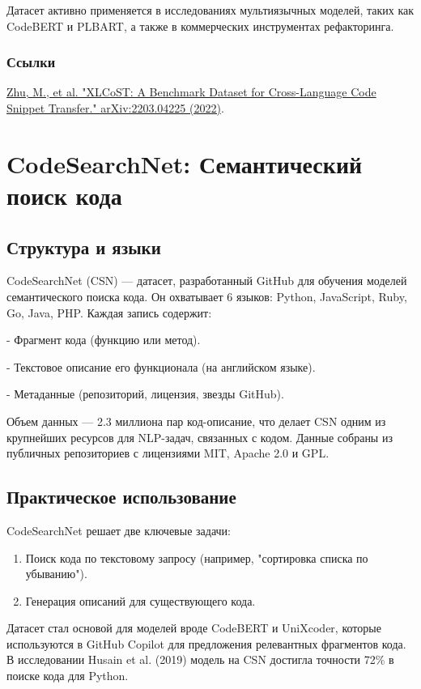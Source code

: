 Датасет активно применяется в исследованиях мультиязычных моделей, таких как CodeBERT и PLBART, а также в коммерческих инструментах рефакторинга.

\subsubsection*{Ссылки}
\href{https://arxiv.org/abs/2203.04225}{Zhu, M., et al. "XLCoST: A Benchmark Dataset for Cross-Language Code Snippet Transfer." arXiv:2203.04225 (2022)}.

\newpage

\section{CodeSearchNet: Семантический поиск кода}

\subsection{Структура и языки}
CodeSearchNet (CSN) — датасет, разработанный GitHub для обучения моделей семантического поиска кода. Он охватывает 6 языков: Python, JavaScript, Ruby, Go, Java, PHP. Каждая запись содержит:

    
- Фрагмент кода (функцию или метод).
    
- Текстовое описание его функционала (на английском языке).
    
- Метаданные (репозиторий, лицензия, звезды GitHub).


Объем данных — 2.3 миллиона пар код-описание, что делает CSN одним из крупнейших ресурсов для NLP-задач, связанных с кодом. Данные собраны из публичных репозиториев с лицензиями MIT, Apache 2.0 и GPL.

\subsection{Практическое использование}
CodeSearchNet решает две ключевые задачи:
\begin{enumerate}
    \item Поиск кода по текстовому запросу (например, "сортировка списка по убыванию").
    \item Генерация описаний для существующего кода.
\end{enumerate}

Датасет стал основой для моделей вроде CodeBERT и UniXcoder, которые используются в GitHub Copilot для предложения релевантных фрагментов кода. В исследовании Husain et al. (2019) модель на CSN достигла точности 72\% в поиске кода для Python.

